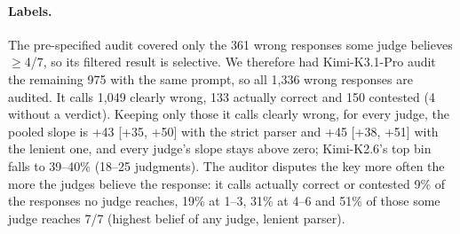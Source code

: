 \documentclass[11pt]{article}
\begin{document}
\paragraph{Labels.}
The pre-specified audit covered only the 361 wrong responses some judge believes $\geq$4/7, so its filtered result
is selective. We therefore had Kimi-K3.1-Pro audit the remaining 975 with the same prompt, so all 1,336 wrong responses are audited. It calls 1,049 clearly wrong, 133 actually correct and 150 contested (4 without a verdict).
Keeping only those it calls clearly wrong, for every judge, the pooled slope is +43 [+35, +50] with the strict
parser and +45 [+38, +51] with the lenient one, and every judge's slope stays above zero; Kimi-K2.6's top bin falls
to 39--40\% (18--25 judgments). The auditor disputes the key more often the more the judges believe the response:
it calls actually correct or contested 9\% of the responses no judge reaches, 19\% at 1--3, 31\% at 4--6 and 51\%
of those some judge reaches 7/7 (highest belief of any judge, lenient parser).
\end{document}
